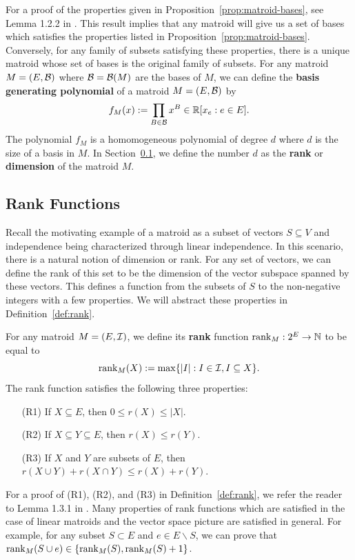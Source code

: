 \documentclass{puthesis-UG}
\begin{document}
For a proof of the properties given in Proposition~\ref{prop:matroid-bases}, see Lemma 1.2.2 in \cite{10.5555/1197093}. This result implies that any matroid will give us a set of bases which satisfies the properties listed in Proposition~\ref{prop:matroid-bases}. Conversely, for any family of subsets satisfying these properties, there is a unique matroid whose set of bases is the original family of subsets. For any matroid $M = (E, \mathcal{B})$ where $\mathcal{B} = \mathcal{B}(M)$ are the bases of $M$, we can define the \textbf{basis generating polynomial} of a matroid $M = (E, \mathcal{B})$ by
\[
	f_M (x) := \prod_{B \in \mathcal{B}} x^B \in \mathbb{R}[x_e : e \in E].
\]
The polynomial $f_M$ is a homomogeneous polynomial of degree $d$ where $d$ is the size of a basis in $M$. In Section~\ref{sec:rank}, we define the number $d$ as the \textbf{rank} or \textbf{dimension} of the matroid $M$. 

\subsection{Rank Functions} \label{sec:rank}

Recall the motivating example of a matroid as a subset of vectors $S \subseteq V$ and independence being characterized through linear independence. In this scenario, there is a natural notion of dimension or rank. For any set of vectors, we can define the rank of this set to be the dimension of the vector subspace spanned by these vectors. This defines a function from the subsets of $S$ to the non-negative integers with a few properties. We will abstract these properties in Definition~\ref{def:rank}. 

\begin{defn} \label{def:rank}
	For any matroid $M = (E, \mathcal{I})$, we define its \textbf{rank} function $\operatorname{rank}_M : 2^E \to \mathbb{N}$ to be equal to
	\[
		\operatorname{rank}_M(X) := \max \{|I| : I \in \mathcal{I}, I \subseteq X\}.
	\]
	The rank function satisfies the following three properties:
	\begin{enumerate}
		\item[(R1)] If $X \subseteq E$, then $0 \leq r(X) \leq |X|$. 
		\item[(R2)] If $X \subseteq Y \subseteq E$, then $r(X) \leq r(Y)$. 
		\item[(R3)] If $X$ and $Y$ are subsets of $E$, then $r(X \cup Y) + r(X \cap Y) \leq r(X) + r(Y)$.
	\end{enumerate}
\end{defn}

For a proof of (R1), (R2), and (R3) in Definition~\ref{def:rank}, we refer the reader to Lemma 1.3.1 in \cite{10.5555/1197093}. Many properties of rank functions which are satisfied in the case of linear matroids and the vector space picture are satisfied in general. For example, for any subset $S \subset E$ and $e \in E \backslash S$, we can prove that $\operatorname{rank}_M(S \cup e) \in \{\operatorname{rank}_M(S), \operatorname{rank}_M(S) + 1\}$. 
\end{document}
